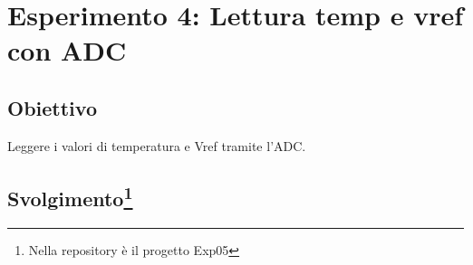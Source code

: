 \chapter*{Esperimento 4: Lettura temp e vref con ADC}

\section*{Obiettivo}
Leggere i valori di temperatura e Vref tramite l'ADC.

\section*{Svolgimento\footnote{Nella repository è il progetto Exp05}}